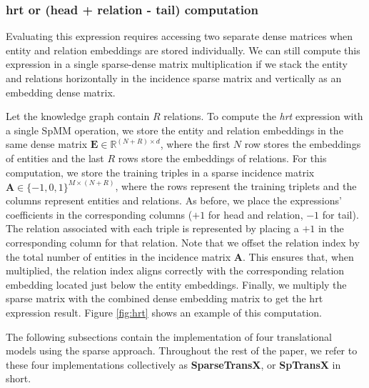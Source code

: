 \subsubsection{hrt or (head + relation - tail) computation}
\label{sec:hrt}
Evaluating this expression requires accessing two separate dense matrices when entity and relation embeddings are stored individually. We can still compute this expression in a single sparse-dense matrix multiplication if we stack the entity and relations horizontally in the incidence sparse matrix and vertically as an embedding dense matrix.

Let the knowledge graph contain 
$R$ relations.
To compute the \emph{hrt} expression with a single SpMM operation, we store the entity and relation embeddings in the same dense matrix $\mathbf{E} \in \mathbb{R}^{(N+R)\times d}$, where the first $N$ row stores the embeddings of entities and the last $R$ rows store the embeddings of relations.
For this computation, we store the training triples in a sparse incidence matrix $\mathbf{A} \in \{-1,0,1\}^{M\times (N+R)}$, where the rows represent the training triplets and the columns represent entities and relations.
As before, we place the expressions' coefficients in the corresponding columns ($+1$ for head and relation, $-1$ for tail).  The relation associated with each triple is represented by placing a $+1$ in the corresponding column for that relation.  
Note that we offset the relation index by the total number of entities in the incidence matrix $\mathbf{A}$. This ensures that, when multiplied, the relation index aligns correctly with the corresponding relation embedding located just below the entity embeddings.
Finally, we multiply the sparse matrix with the combined dense embedding matrix to get the hrt expression result. Figure \ref{fig:hrt} shows an example of this computation.

The following subsections contain the implementation of four translational models using the sparse approach. Throughout the rest of the paper, we refer to these four implementations collectively as \textbf{SparseTransX}, or \textbf{SpTransX} in short.

